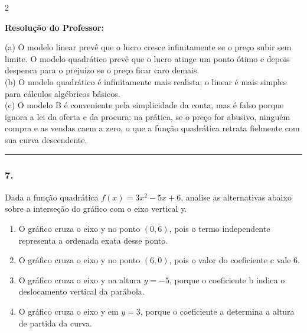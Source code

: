\begin{multicols*}{2}
\ifgabarito
    \begin{tcolorbox}[colback=CorTitUm!5, colframe=CorTitUm, boxrule=1pt, arc=4pt, left=6pt, right=6pt, top=6pt, bottom=6pt]
    \small\textbf{\textcolor{CorTitUm}{Resolução do Professor:}}\par\vspace{0.1cm}
    \color{CinzaEscuro}
    (a) O modelo linear prevê que o lucro cresce infinitamente se o preço subir sem limite. O modelo quadrático prevê que o lucro atinge um ponto ótimo e depois despenca para o prejuízo se o preço ficar caro demais. \\
    (b) O modelo quadrático é infinitamente mais realista; o linear é mais simples para cálculos algébricos básicos. \\
    (c) O modelo B é conveniente pela simplicidade da conta, mas é falso porque ignora a lei da oferta e da procura: na prática, se o preço for abusivo, ninguém compra e as vendas caem a zero, o que a função quadrática retrata fielmente com sua curva descendente.
    \end{tcolorbox}
\fi

\par\vspace{\espacoQuestao}

\noindent\textcolor{CorLinha}{\rule{\linewidth}{0.5pt}} 
\par\vspace{\espacoPreQuestao}
\subsubsection*{7.} Dada a função quadrática $f(x) = 3x^2 - 5x + 6$, analise as alternativas abaixo sobre a interseção do gráfico com o eixo vertical y.

\begin{enumerate}[label=\alph*), itemsep=\espacoAlt]
\item O gráfico cruza o eixo y no ponto $(0,6)$, pois o termo independente representa a ordenada exata desse ponto.
\item O gráfico cruza o eixo y no ponto $(6,0)$, pois o valor do coeficiente c vale 6.
\item O gráfico cruza o eixo y na altura $y = -5$, porque o coeficiente b indica o deslocamento vertical da parábola.
\item O gráfico cruza o eixo y em $y = 3$, porque o coeficiente a determina a altura de partida da curva.
\end{enumerate}


\end{multicols*}
